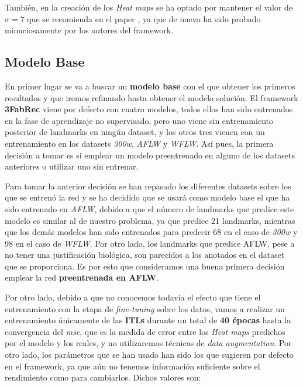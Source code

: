         \medskip

        \noindent También, en la creación de los \textit{Heat maps} se ha optado por mantener el valor de $\sigma =7$ que se recomienda en el paper \cite{browatzki20203fabrec}, ya que de nuevo ha sido probado minuciosamente por los autores del framework.
    
    \subsection{Modelo Base}
        \noindent En primer lugar se va a buscar un \textbf{modelo base} con el que obtener los primeros resultados y que iremos refinando hasta obtener el modelo solución. El framework \textbf{3FabRec} viene por defecto con cuatro modelos, todos ellos han sido entrenados en la fase de aprendizaje no supervisado, pero uno viene sin entrenamiento posterior de landmarks en ningún dataset, y los otros tres vienen con un entrenamiento en los datasets \textit{300w}, \textit{AFLW} y \textit{WFLW}. Así pues, la primera decisión a tomar es si emplear un modelo preentrenado en alguno de los datasets anteriores o utilizar uno sin entrenar. 

        \medskip

        \noindent Para tomar la anterior decisión se han repasado los diferentes datasets sobre los que se entrenó la red y se ha decidido que se usará como modelo base el que ha sido entrenado en \textit{AFLW}, debido a que el número de landmarks que predice este modelo es similar al de nuestro problema, ya que predice 21 landmarks, mientras que los demás modelos han sido entrenados para predecir 68 en el caso de \textit{300w} y 98 en el caso de \textit{WFLW}. Por otro lado, los landmarks que predice AFLW, pese a no tener una justificación biológica, son parecidos a los anotados en el dataset que se proporciona. Es por esto que consideramos una buena primera decisión emplear la red \textbf{preentrenada en AFLW}.


        \medskip

        \noindent Por otro lado, debido a que no conocemos todavía el efecto que tiene el entrenamiento con la etapa de \textit{fine-tuning} sobre los datos, vamos a realizar un entrenamiento únicamente de las \textbf{ITLs} durante un total de \textbf{40 épocas} hasta la convergencia del \textit{mse}, que es la medida de error entre los \textit{Heat maps} predichos por el modelo y los reales, y no utilizaremos técnicas de \textit{data augmentation}. Por otro lado, los parámetros que se han usado han sido los que sugieren por defecto en el framework, ya que aún no tenemos información suficiente sobre el rendimiento como para cambiarlos. Dichos valores son: 

